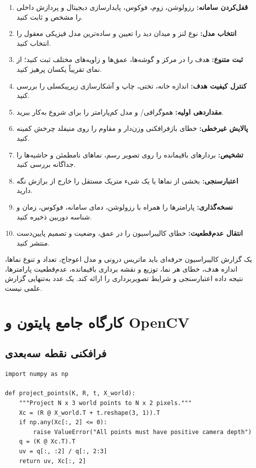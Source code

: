 \documentclass[12pt,openany,oneside]{book}
\begin{document}
\begin{enumerate}
\item \textbf{قفل‌کردن سامانه:} رزولوشن، زوم، فوکوس، پایدارسازی دیجیتال و پردازش داخلی را مشخص و ثابت کنید.
\item \textbf{انتخاب مدل:} نوع لنز و میدان دید را تعیین و ساده‌ترین مدل فیزیکی معقول را انتخاب کنید.
\item \textbf{ثبت متنوع:} هدف را در مرکز و گوشه‌ها، عمق‌ها و زاویه‌های مختلف ثبت کنید؛ از نمای تقریباً یکسان پرهیز کنید.
\item \textbf{کنترل کیفیت هدف:} اندازه خانه، تختی، چاپ و آشکارسازی زیرپیکسلی را بررسی کنید.
\item \textbf{مقداردهی اولیه:} هموگرافی/ و مدل کم‌پارامتر را برای شروع به‌کار ببرید.
\item \textbf{پالایش غیرخطی:} خطای بازفرافکنی وزن‌دار و مقاوم را روی منیفلد چرخش کمینه کنید.
\item \textbf{تشخیص:} بردارهای باقیمانده را روی تصویر رسم، نماهای نامطمئن و حاشیه‌ها را جداگانه بررسی کنید.
\item \textbf{اعتبارسنجی:} بخشی از نماها یا یک شیء متریک مستقل را خارج از برازش نگه دارید.
\item \textbf{نسخه‌گذاری:} پارامترها را همراه با رزولوشن، دمای سامانه، فوکوس، زمان و شناسه دوربین ذخیره کنید.
\item \textbf{انتقال عدم‌قطعیت:} خطای کالیبراسیون را در عمق، وضعیت و تصمیم پایین‌دست منتشر کنید.
\end{enumerate}

\begin{keybox}
یک گزارش کالیبراسیون حرفه‌ای باید ماتریس درونی و مدل اعوجاج، تعداد و تنوع نماها، اندازه هدف، خطای هر نما، توزیع و نقشه
برداری باقیمانده، عدم‌قطعیت پارامترها، نتیجه داده اعتبارسنجی و شرایط تصویربرداری را ارائه کند. یک عدد  به‌تنهایی
گزارش علمی نیست.
\end{keybox}

\section{کارگاه جامع پایتون و OpenCV}

\subsection{فرافکنی نقطه سه‌بعدی}
\begin{latin}
\begin{lstlisting}
import numpy as np

def project_points(K, R, t, X_world):
    """Project N x 3 world points to N x 2 pixels."""
    Xc = (R @ X_world.T + t.reshape(3, 1)).T
    if np.any(Xc[:, 2] <= 0):
        raise ValueError("All points must have positive camera depth")
    q = (K @ Xc.T).T
    uv = q[:, :2] / q[:, 2:3]
    return uv, Xc[:, 2]
\end{lstlisting}
\end{latin}
\end{document}
